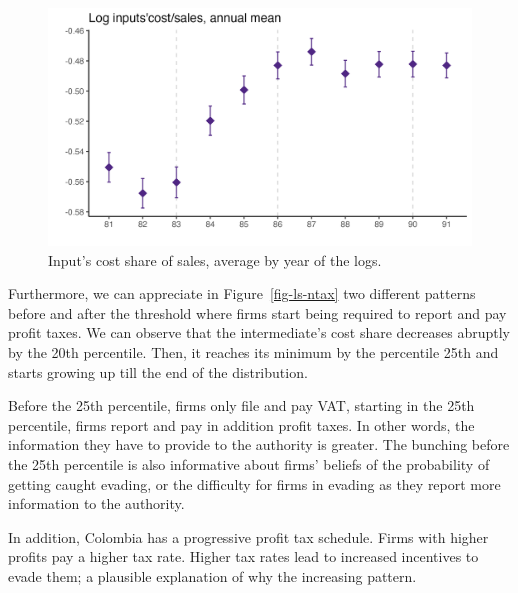 \documentclass[
  12pt]{article}
\theoremstyle{definition}
\theoremstyle{remark}
\begin{document}
\begin{figure}

{\centering \includegraphics[width=1\textwidth,height=\textheight]{../Results/Figures/Colombia/log_share_byy.png}

}

\caption{\label{fig-logshare}Input's cost share of sales, average by
year of the logs.}

\end{figure}

Furthermore, we can appreciate in Figure~\ref{fig-ls-ntax} two different
patterns before and after the threshold where firms start being required
to report and pay profit taxes. We can observe that the intermediate's
cost share decreases abruptly by the 20th percentile. Then, it reaches
its minimum by the percentile 25th and starts growing up till the end of
the distribution.

Before the 25th percentile, firms only file and pay VAT, starting in the
25th percentile, firms report and pay in addition profit taxes. In other
words, the information they have to provide to the authority is greater.
The bunching before the 25th percentile is also informative about firms'
beliefs of the probability of getting caught evading, or the difficulty
for firms in evading as they report more information to the authority.

In addition, Colombia has a progressive profit tax schedule. Firms with
higher profits pay a higher tax rate. Higher tax rates lead to increased
incentives to evade them; a plausible explanation of why the increasing
pattern.
\end{document}
